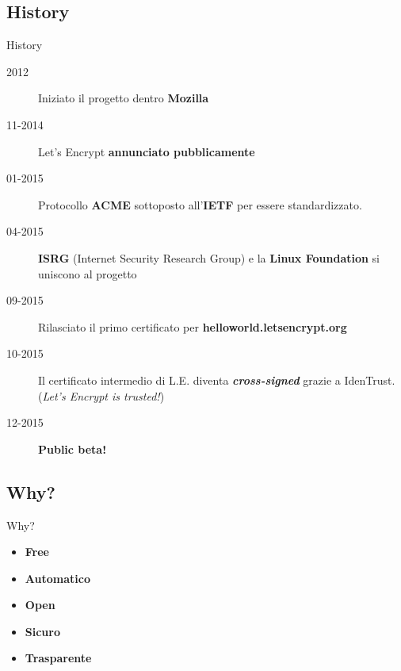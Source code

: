 \documentclass[xcolor=svgnames,11pt]{beamer}
\begin{document}
\subsection{History}
\begin{frame}{History}
\begin{description}
  \item[2012] Iniziato il progetto dentro \textbf{Mozilla}
  \pause
  \item[11-2014] Let's Encrypt \textbf{annunciato pubblicamente}
  \pause
  \item[01-2015] Protocollo \textbf{ACME} sottoposto all'\textbf{IETF} per essere standardizzato.
  \pause
  \item[04-2015] \textbf{ISRG} (Internet Security Research Group) e la \textbf{Linux Foundation}
  si uniscono al progetto
  \pause
  \item[09-2015] Rilasciato il primo certificato per \textbf{helloworld.letsencrypt.org}
  \pause
  \item[10-2015] Il certificato intermedio di L.E. diventa \textbf{\emph{cross-signed}} grazie a IdenTrust.
  (\emph{Let's Encrypt is trusted!})
  \pause
  \item[12-2015] \textbf{Public beta!}
\end{description}
\end{frame}

\subsection{Why?}
\begin{frame}{Why?}
\begin{itemize}
  \item \textbf{Free}
  \item \textbf{Automatico}
  \item \textbf{Open}
  \item \textbf{Sicuro}
  \item \textbf{Trasparente}
\end{itemize}
\end{frame}
\end{document}
